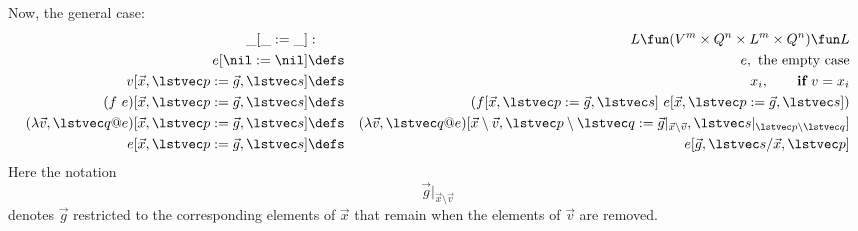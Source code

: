 Now, the general case:
\begin{eqnarray*}
   \_[\_:=\_] &:& L \fun (V^m \times Q^n \times L^m \times Q^n) \fun L
\\ e[\nil:=\nil] &\defs& e, \mbox{ the empty case}
\\ v[\vec x,\lstvec p:=\vec g,\lstvec s] 
  &\defs& x_i, \qquad \textbf{if}~ v = x_i
\\ (f~e)[\vec x,\lstvec p:=\vec g,\lstvec s] 
  &\defs& (f[\vec x,\lstvec p:=\vec g,\lstvec s]~e[\vec x,\lstvec p:=\vec g,\lstvec s])
\\ (\lambda \vec v,\lstvec q @ e)[\vec x,\lstvec p:=\vec g,\lstvec s]
   &\defs&
   (\lambda \vec v,\lstvec q @ e)
   [\vec x\setminus\vec v,\lstvec p\setminus\lstvec q
    :=
    \vec g|_{\vec x\setminus\vec v},\lstvec s|_{\lstvec p\setminus\lstvec q}]
\\ e[\vec x,\lstvec p:=\vec g,\lstvec s] &\defs& e[\vec g,\lstvec s/\vec x,\lstvec p]
\end{eqnarray*}
Here the notation
$$
\vec g|_{\vec x\setminus\vec v}
$$
denotes $\vec g$ restricted to the corresponding elements of $\vec x$
that remain when the elements of $\vec v$ are removed.
